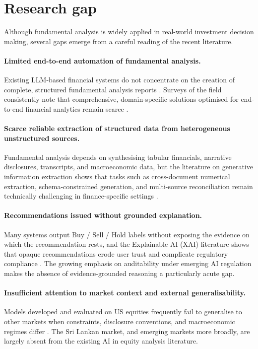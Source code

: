 
\section{Research gap}
Although fundamental analysis is widely applied in real-world investment decision making, several gaps emerge from a careful reading of the recent literature.

\paragraph{\textbf{Limited end-to-end automation of fundamental analysis.}} Existing LLM-based financial systems do not concentrate on the creation of complete, structured fundamental analysis reports \citep{Papasotiriou2024,Cheng2025,rezaei2025gwise}. Surveys of the field consistently note that comprehensive, domain-specific solutions optimised for end-to-end financial analytics remain scarce \citep{Fatouros2025MarketSense,Cernevicene2024}.

\paragraph{\textbf{Scarce reliable extraction of structured data from heterogeneous unstructured sources.}} Fundamental analysis depends on synthesising tabular financials, narrative disclosures, transcripts, and macroeconomic data, but the literature on generative information extraction shows that tasks such as cross-document numerical extraction, schema-constrained generation, and multi-source reconciliation remain technically challenging in finance-specific settings \citep{Xu2024IE,Provakar2024QA}.

\paragraph{\textbf{Recommendations issued without grounded explanation.}} Many systems output Buy / Sell / Hold labels without exposing the evidence on which the recommendation rests, and the Explainable AI (XAI) literature shows that opaque recommendations erode user trust and complicate regulatory compliance \citep{Cernevicene2024,Acharya2025AgenticAI}. The growing emphasis on auditability under emerging AI regulation makes the absence of evidence-grounded reasoning a particularly acute gap.

\paragraph{\textbf{Insufficient attention to market context and external generalisability.}} Models developed and evaluated on US equities frequently fail to generalise to other markets when constraints, disclosure conventions, and macroeconomic regimes differ \citep{Bangun2025,Li2026FINSABER}. The Sri Lankan market, and emerging markets more broadly, are largely absent from the existing AI in equity analysis literature.

